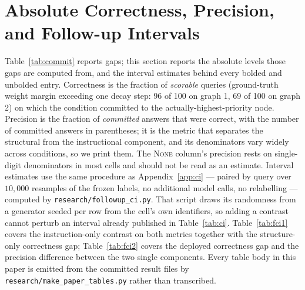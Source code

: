 \documentclass[11pt]{article}
\begin{document}
\section{Absolute Correctness, Precision, and Follow-up Intervals}
\label{app:followup}

Table~\ref{tab:commit} reports gaps; this section reports the absolute
levels those gaps are computed from, and the interval estimates behind every
bolded and unbolded entry. Correctness is the fraction of \emph{scorable}
queries (ground-truth weight margin exceeding one decay step: 96 of 100 on
graph 1, 69 of 100 on graph 2) on which the condition committed to the
actually-highest-priority node. Precision is the fraction of \emph{committed}
answers that were correct, with the number of committed answers in
parentheses; it is the metric that separates the structural from the
instructional component, and its denominators vary widely across conditions,
so we print them. The \textsc{None} column's precision rests on single-digit
denominators in most cells and should not be read as an estimate.
Interval estimates use the same procedure as Appendix~\ref{app:ci} --- paired
by query over $10{,}000$ resamples of the frozen labels, no additional model
calls, no relabelling --- computed by \texttt{research/followup\_ci.py}. That
script draws its randomness from a generator seeded per row from the cell's
own identifiers, so adding a contrast cannot perturb an interval already
published in Table~\ref{tab:ci}. Table~\ref{tab:fci1} covers the
instruction-only contrast on both metrics together with the structure-only
correctness gap; Table~\ref{tab:fci2} covers the deployed correctness gap and
the precision difference between the two single components. Every table body
in this paper is emitted from the committed result files by
\texttt{research/make\_paper\_tables.py} rather than transcribed.
\end{document}

